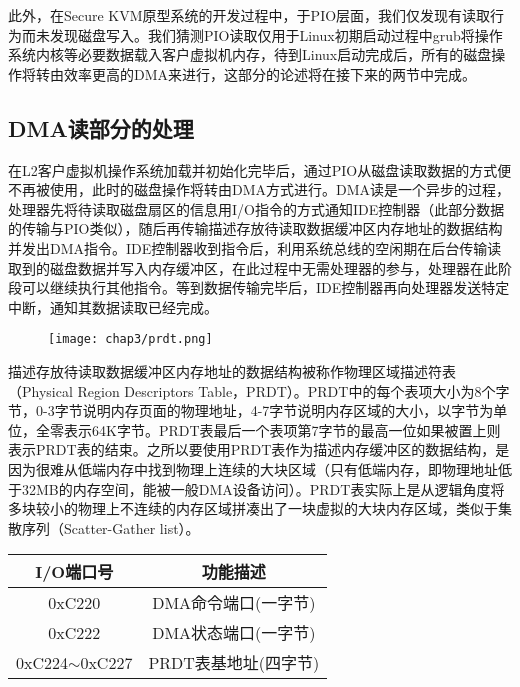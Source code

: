 此外，在Secure KVM原型系统的开发过程中，于PIO层面，我们仅发现有读取行为而未发现磁盘写入。我们猜测PIO读取仅用于Linux初期启动过程中grub\cite{grub}将操作系统内核等必要数据载入客户虚拟机内存，待到Linux启动完成后，所有的磁盘操作将转由效率更高的DMA来进行，这部分的论述将在接下来的两节中完成。

\subsection{DMA读部分的处理}

在L2客户虚拟机操作系统加载并初始化完毕后，通过PIO从磁盘读取数据的方式便不再被使用，此时的磁盘操作将转由DMA方式进行。DMA读是一个异步的过程，处理器先将待读取磁盘扇区的信息用I/O指令的方式通知IDE控制器（此部分数据的传输与PIO类似），随后再传输描述存放待读取数据缓冲区内存地址的数据结构并发出DMA指令。IDE控制器收到指令后，利用系统总线的空闲期在后台传输读取到的磁盘数据并写入内存缓冲区，在此过程中无需处理器的参与，处理器在此阶段可以继续执行其他指令。等到数据传输完毕后，IDE控制器再向处理器发送特定中断，通知其数据读取已经完成。

\begin{figure}[!htbp]
  \centering
  \texttt{[image: chap3/prdt.png]}
\end{figure}

描述存放待读取数据缓冲区内存地址的数据结构被称作物理区域描述符表（Physical Region Descriptors Table，PRDT）。PRDT中的每个表项大小为8个字节，0-3字节说明内存页面的物理地址，4-7字节说明内存区域的大小，以字节为单位，全零表示64K字节。PRDT表最后一个表项第7字节的最高一位如果被置上则表示PRDT表的结束。之所以要使用PRDT表作为描述内存缓冲区的数据结构，是因为很难从低端内存中找到物理上连续的大块区域（只有低端内存，即物理地址低于32MB的内存空间，能被一般DMA设备访问）。PRDT表实际上是从逻辑角度将多块较小的物理上不连续的内存区域拼凑出了一块虚拟的大块内存区域，类似于集散序列（Scatter-Gather list）。

\begin{table}[!htpb]
\centering
\begin{tabular}{cc}
\toprule
I/O端口号	& 功能描述\\
\midrule
0xC220	&DMA命令端口(一字节)\\
0xC222	&DMA状态端口(一字节)\\
0xC224$\sim$0xC227 &PRDT表基地址(四字节)\\
\bottomrule
\end{tabular}
\end{table}

